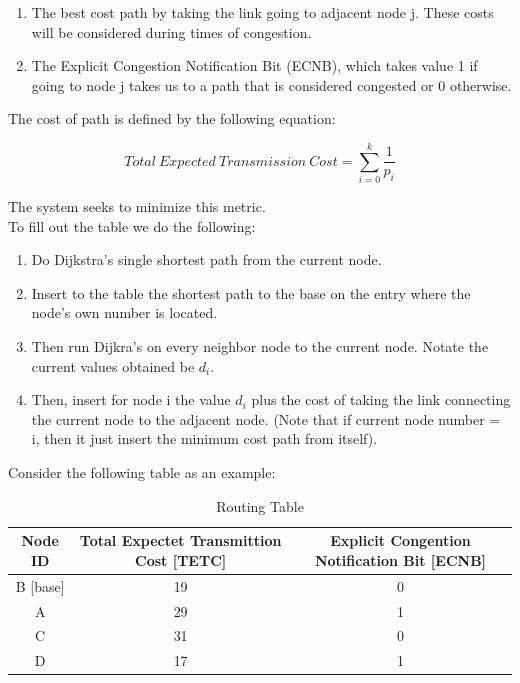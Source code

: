 \documentclass[letterpaper]{article}
\begin{document}
\begin{enumerate}
  \item The best cost path by taking the link going to adjacent node j. These costs will be considered during times of congestion.
  \item The Explicit Congestion Notification Bit (ECNB), which takes value 1 if going to node j takes us to a path that is considered congested or 0 otherwise.
\end{enumerate}

\noindent The cost of path is defined by the following equation:

$$  Total \ Expected \ Transmission \ Cost = \sum_{i=0}^{k}\frac{1}{p_{i}}$$

\noindent The system seeks to minimize this metric.
\\

\noindent To fill out the table we do the following:

\begin{enumerate}
  \item Do Dijkstra's single shortest path from the current node.  
  \item Insert to the table the shortest path to the base on the entry where the node's own number is located.
  \item Then run Dijkra's on every neighbor node to the current node. Notate the current values obtained be $d_{i}$.
  \item Then, insert for node i the value $d_{i}$ plus the cost of taking the link connecting the current node to the adjacent node. (Note that if current node number = i, then it just insert the minimum cost path from itself).
\end{enumerate}

\noindent Consider the following table as an example:

\begin{table}[ht]
\caption{Routing Table} %
\centering %
\begin{tabular}{c c c} %
\hline
\hline %
Node ID & Total Expectet Transmittion Cost [TETC] & Explicit Congention Notification Bit [ECNB]  \\[0.5ex] %
\hline %
B [base] & 19 & 0\\
A & 29 & 1\\
C & 31 & 0 \\
D & 17 & 1\\ [1ex]
\hline
\end{tabular}
\label{table:nonlin}
\end{table}
\end{document}
